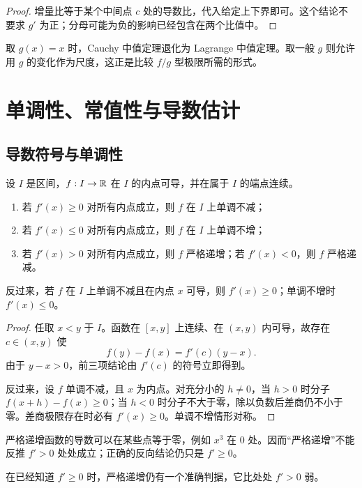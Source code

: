 \begin{proof}
增量比等于某个中间点 \(c\) 处的导数比，代入给定上下界即可。这个结论不要求 \(g'\) 为正；分母可能为负的影响已经包含在两个比值中。
\end{proof}

取 \(g(x)=x\) 时，Cauchy 中值定理退化为 Lagrange 中值定理。取一般 \(g\) 则允许用 \(g\) 的变化作为尺度，这正是比较 \(f/g\) 型极限所需的形式。

\section{单调性、常值性与导数估计}
\label{sec:mvt-consequences}

\subsection{导数符号与单调性}

\begin{theorem}[导数符号判据]
\label{thm:derivative-sign-monotonicity}
设 \(I\) 是区间，\(f:I\to\mathbb{R}\) 在 \(I\) 的内点可导，并在属于 \(I\) 的端点连续。
\begin{enumerate}
 \item 若 \(f'(x)\ge0\) 对所有内点成立，则 \(f\) 在 \(I\) 上单调不减；
 \item 若 \(f'(x)\le0\) 对所有内点成立，则 \(f\) 在 \(I\) 上单调不增；
 \item 若 \(f'(x)>0\) 对所有内点成立，则 \(f\) 严格递增；若 \(f'(x)<0\)，则 \(f\) 严格递减。
\end{enumerate}
反过来，若 \(f\) 在 \(I\) 上单调不减且在内点 \(x\) 可导，则 \(f'(x)\ge0\)；单调不增时 \(f'(x)\le0\)。
\end{theorem}

\begin{proof}
任取 \(x<y\) 于 \(I\)。函数在 \([x,y]\) 上连续、在 \((x,y)\) 内可导，故存在 \(c\in(x,y)\) 使
\[
 f(y)-f(x)=f'(c)(y-x).
\]
由于 \(y-x>0\)，前三项结论由 \(f'(c)\) 的符号立即得到。

反过来，设 \(f\) 单调不减，且 \(x\) 为内点。对充分小的 \(h\ne0\)，当 \(h>0\) 时分子 \(f(x+h)-f(x)\ge0\)；当 \(h<0\) 时分子不大于零，除以负数后差商仍不小于零。差商极限存在时必有 \(f'(x)\ge0\)。单调不增情形对称。
\end{proof}

严格递增函数的导数可以在某些点等于零，例如 \(x^3\) 在 \(0\) 处。因而“严格递增”不能反推 \(f'>0\) 处处成立；正确的反向结论仍只是 \(f'\ge0\)。

在已经知道 \(f'\ge0\) 时，严格递增仍有一个准确判据，它比处处 \(f'>0\) 弱。

